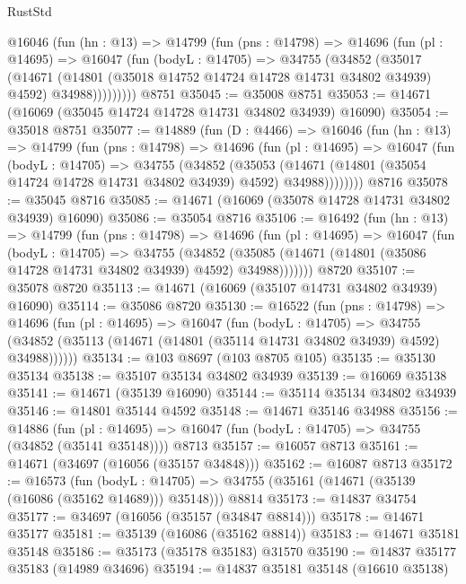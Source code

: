 \begin{lexlean}{RustStd}
\begin{coremodule}
      @16046
        (fun (hn : @13) =>
        @14799
          (fun (pns : @14798) =>
          @14696
            (fun (pl : @14695) =>
            @16047
              (fun (bodyL : @14705) =>
              @34755
                (@34852
                  (@35017
                    (@14671
                      (@14801 (@35018 @14752 @14724 @14728 @14731 @34802 @34939) @4592)
                      @34988)))))))))
    @8751
@35045 := @35008 @8751
@35053 := @14671 (@16069 (@35045 @14724 @14728 @14731 @34802 @34939) @16090)
@35054 := @35018 @8751
@35077 := @14889
    (fun (D : @4466) =>
    @16046
      (fun (hn : @13) =>
      @14799
        (fun (pns : @14798) =>
        @14696
          (fun (pl : @14695) =>
          @16047
            (fun (bodyL : @14705) =>
            @34755
              (@34852
                (@35053
                  (@14671 (@14801 (@35054 @14724 @14728 @14731 @34802 @34939) @4592) @34988))))))))
    @8716
@35078 := @35045 @8716
@35085 := @14671 (@16069 (@35078 @14728 @14731 @34802 @34939) @16090)
@35086 := @35054 @8716
@35106 := @16492
    (fun (hn : @13) =>
    @14799
      (fun (pns : @14798) =>
      @14696
        (fun (pl : @14695) =>
        @16047
          (fun (bodyL : @14705) =>
          @34755
            (@34852
              (@35085 (@14671 (@14801 (@35086 @14728 @14731 @34802 @34939) @4592) @34988)))))))
    @8720
@35107 := @35078 @8720
@35113 := @14671 (@16069 (@35107 @14731 @34802 @34939) @16090)
@35114 := @35086 @8720
@35130 := @16522
    (fun (pns : @14798) =>
    @14696
      (fun (pl : @14695) =>
      @16047
        (fun (bodyL : @14705) =>
        @34755 (@34852 (@35113 (@14671 (@14801 (@35114 @14731 @34802 @34939) @4592) @34988))))))
@35134 := @103 @8697 (@103 @8705 @105)
@35135 := @35130 @35134
@35138 := @35107 @35134 @34802 @34939
@35139 := @16069 @35138
@35141 := @14671 (@35139 @16090)
@35144 := @35114 @35134 @34802 @34939
@35146 := @14801 @35144 @4592
@35148 := @14671 @35146 @34988
@35156 := @14886
    (fun (pl : @14695) => @16047 (fun (bodyL : @14705) => @34755 (@34852 (@35141 @35148))))
    @8713
@35157 := @16057 @8713
@35161 := @14671 (@34697 (@16056 (@35157 @34848)))
@35162 := @16087 @8713
@35172 := @16573
    (fun (bodyL : @14705) => @34755 (@35161 (@14671 (@35139 (@16086 (@35162 @14689))) @35148)))
    @8814
@35173 := @14837 @34754
@35177 := @34697 (@16056 (@35157 (@34847 @8814)))
@35178 := @14671 @35177
@35181 := @35139 (@16086 (@35162 @8814))
@35183 := @14671 @35181 @35148
@35186 := @35173 (@35178 @35183) @31570
@35190 := @14837 @35177 @35183 (@14989 @34696)
@35194 := @14837 @35181 @35148 (@16610 @35138)

\end{coremodule}
\end{lexlean}
